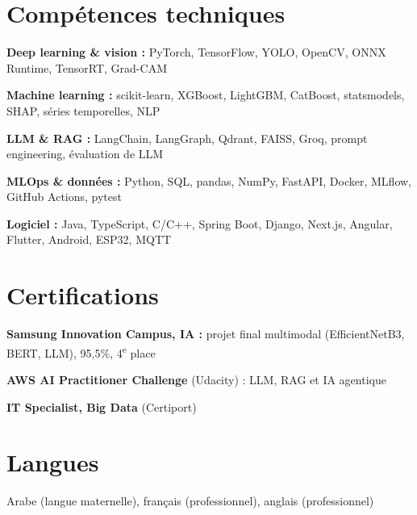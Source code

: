 \documentclass[a4paper,11pt]{article}
\begin{document}
\section{Compétences techniques}
\small
\textbf{Deep learning \& vision :} PyTorch, TensorFlow, YOLO, OpenCV, ONNX Runtime, TensorRT, Grad-CAM\par\vspace{2pt}
\textbf{Machine learning :} scikit-learn, XGBoost, LightGBM, CatBoost, statsmodels, SHAP, séries temporelles, NLP\par\vspace{2pt}
\textbf{LLM \& RAG :} LangChain, LangGraph, Qdrant, FAISS, Groq, prompt engineering, évaluation de LLM\par\vspace{2pt}
\textbf{MLOps \& données :} Python, SQL, pandas, NumPy, FastAPI, Docker, MLflow, GitHub Actions, pytest\par\vspace{2pt}
\textbf{Logiciel :} Java, TypeScript, C/C++, Spring Boot, Django, Next.js, Angular, Flutter, Android, ESP32, MQTT\par
\normalsize

\section{Certifications}
\small
\textbf{Samsung Innovation Campus, IA :} projet final multimodal (EfficientNetB3, BERT, LLM), 95,5\%, 4\textsuperscript{e} place\par\vspace{2pt}
\textbf{AWS AI Practitioner Challenge} (Udacity) : LLM, RAG et IA agentique\par\vspace{2pt}
\textbf{IT Specialist, Big Data} (Certiport)\par
\normalsize

\section{Langues}
\small Arabe (langue maternelle), français (professionnel), anglais (professionnel)
\end{document}
